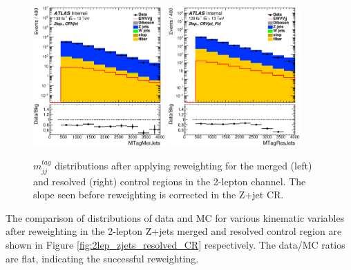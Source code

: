 \begin{figure}[ht]
    \centering
    \includegraphics[width=0.45\textwidth]{figures/2lep/reweighting/after_reweighting/C_0ptag1pfat0pjet_0ptv_CRVjet_MTagMerJets_Log.eps}
    \includegraphics[width=0.45\textwidth]{figures/2lep/reweighting/after_reweighting/C_0ptag2pjet_0ptv_CRVjet_Fid_MTagResJets_Log.eps}
    \caption{ $m^{tag}_{jj}$ distributions after applying reweighting for the merged (left) and resolved (right) control regions in the 2-lepton channel. The slope seen before reweighting is corrected in the Z+jet CR.}
    \label{fig:2lep_mtag_before_rw}
\end{figure}


The comparison of distributions of data and MC for various kinematic variables after reweighting in the 2-lepton Z+jets merged and resolved control region are shown in Figure \ref{fig:2lep_zjets_resolved_CR}
respectively. The data/MC ratios are flat, indicating the successful reweighting.

